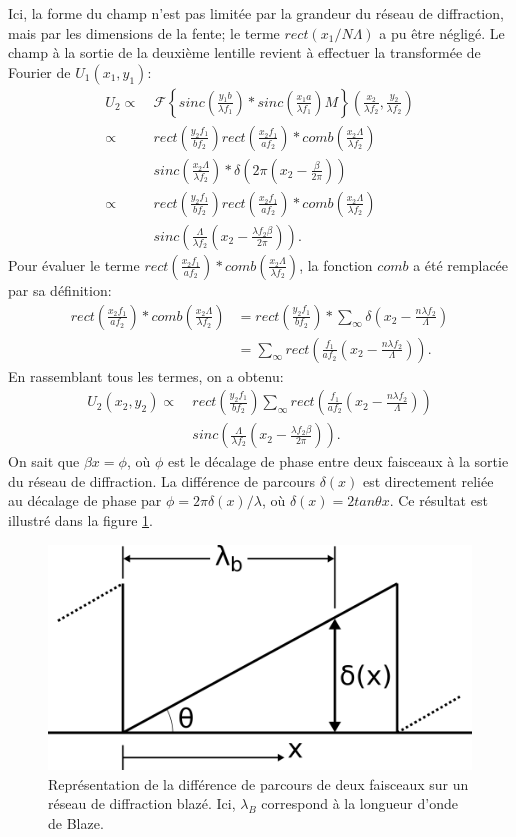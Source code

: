 \documentclass[conference]{IEEEtran}
\begin{document}
Ici, la forme du champ n'est pas limitée par la grandeur du réseau de diffraction, mais par les dimensions
de la fente; le terme $rect(x_1/N\Lambda)$ a pu être négligé. Le champ à la sortie de la deuxième lentille revient à effectuer la transformée de Fourier
de $U_1(x_1,y_1)$:
\begin{align*}
    U_2\propto&\ \mathscr{F}\left\{sinc(\frac{y_1b}{\lambda f_1})\ast sinc(\frac{x_1a}{\lambda f_1})M\right\}(\frac{x_2}{\lambda f_2},\frac{y_2}{\lambda f_2})\\
    \propto&\ rect(\frac{y_2 f_1}{b f_2})rect(\frac{x_2 f_1}{a f_2})\ast comb(\frac{x_2 \Lambda}{\lambda f_2})\\
    &\ sinc(\frac{x_2 \Lambda}{\lambda f_2})\ast \delta(2\pi(x_2-\frac{\beta}{2\pi}))\\
    \propto&\ rect(\frac{y_2 f_1}{b f_2})rect(\frac{x_2 f_1}{a f_2})\ast comb(\frac{x_2 \Lambda}{\lambda f_2})\\
    &\ sinc(\frac{\Lambda}{\lambda f_2}(x_2-\frac{\lambda f_2 \beta}{2\pi})).
\end{align*}
Pour évaluer le terme $rect(\frac{x_2 f_1}{a f_2})\ast comb(\frac{x_2 \Lambda}{\lambda f_2})$, la fonction $comb$ a été remplacée par sa définition:
\begin{align*}
    rect(\frac{x_2 f_1}{a f_2})\ast comb(\frac{x_2 \Lambda}{\lambda f_2})&=rect(\frac{y_2 f_1}{b f_2})\ast\sum_{\infty}\delta(x_2-\frac{n\lambda f_2}{\Lambda})\\
    &=\sum_{\infty}rect(\frac{f_1}{a f_2}(x_2-\frac{n\lambda f_2}{\Lambda})).
\end{align*}
En rassemblant tous les termes, on a obtenu:
\begin{align*}
    U_2(x_2,y_2)\propto&\ rect(\frac{y_2 f_1}{b f_2})\sum_{\infty}rect(\frac{f_1}{a f_2}(x_2-\frac{n\lambda f_2}{\Lambda}))\\
    & \ sinc(\frac{\Lambda}{\lambda f_2}(x_2-\frac{\lambda f_2 \beta}{2\pi})).
\end{align*}
On sait que $\beta x = \phi$, où $\phi$ est le décalage de phase entre deux faisceaux à la sortie du réseau de diffraction.
La différence de parcours $\delta(x)$ est directement reliée au décalage de phase par $\phi=2\pi\delta(x)/\lambda$, où $\delta(x)=2tan\theta x$.
Ce résultat est illustré dans la figure \ref{beta}. 
\begin{figure}[H]
    \centering
    \includegraphics[scale=0.2]{beta.png}
    \caption{Représentation de la différence de parcours de deux faisceaux sur un réseau de diffraction
    blazé. Ici, $\lambda_B$ correspond à la longueur d'onde de Blaze. \label{beta}}
\end{figure}
\end{document}
